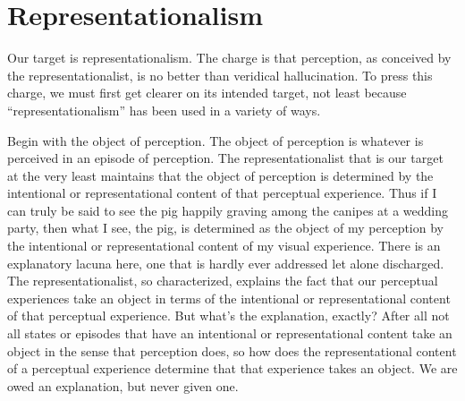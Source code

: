 \documentclass[12pt]{article}
\begin{document}

\section{Representationalism} %
\label{sec:representationalism}

%

Our target is representationalism. The charge is that perception, as conceived by the representationalist, is no better than veridical hallucination. To press this charge, we must first get clearer on its intended target, not least because ``representationalism'' has been used in a variety of ways.

Begin with the object of perception. The object of perception is whatever is perceived in an episode of perception. The representationalist that is our target at the very least maintains that the object of perception is determined by the intentional or representational content of that perceptual experience. Thus if I can truly be said to see the pig happily graving among the canipes at a wedding party, then what I see, the pig, is determined as the object of my perception by the intentional or representational content of my visual experience. There is an explanatory lacuna here, one that is hardly ever addressed let alone discharged. The representationalist, so characterized, explains the fact that our perceptual experiences take an object in terms of the intentional or representational content of that perceptual experience. But what's the explanation, exactly? After all not all states or episodes that have an intentional or representational content take an object in the sense that perception does, so how does the representational content of a perceptual experience determine that that experience takes an object. We are owed an explanation, but never given one.
\end{document}
